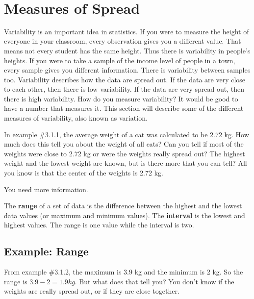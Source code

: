 \documentclass[
]{book}
\begin{document}
\textbf{\\
}

\hypertarget{measures-of-spread}{%
\section{Measures of Spread}\label{measures-of-spread}}

Variability is an important idea in statistics. If you were to measure the height of everyone in your classroom, every observation gives you a different value. That means not every student has the same height. Thus there is variability in people's heights. If you were to take a sample of the income level of people in a town, every sample gives you different information. There is variability between samples too. Variability describes how the data are spread out. If the data are very close to each other, then there is low variability. If the data are very spread out, then there is high variability. How do you measure variability? It would be good to have a number that measures it. This section will describe some of the different measures of variability, also known as variation.

In example \#3.1.1, the average weight of a cat was calculated to be 2.72 kg. How much does this tell you about the weight of all cats? Can you tell if most of the weights were close to 2.72 kg or were the weights really spread out? The highest weight and the lowest weight are known, but is there more that you can tell? All you know is that the center of the weights is 2.72 kg.

You need more information.

The \textbf{range} of a set of data is the difference between the highest and the lowest data values (or maximum and minimum values). The \textbf{interval} is the lowest and highest values. The range is one value while the interval is two.

\hypertarget{example-range}{%
\subsection{Example: Range}\label{example-range}}

From example \#3.1.2, the maximum is 3.9 kg and the minimum is 2 kg. So the range is \(3.9-2=1.9 kg\). But what does that tell you? You don't know if the weights are really spread out, or if they are close together.
\end{document}

